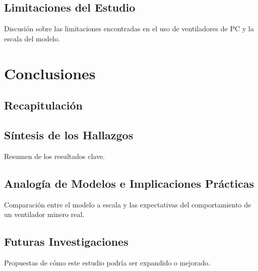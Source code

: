 \documentclass[journal,article,submit,pdftex,moreauthors]{Definitions/mdpi}
\begin{document}
\subsection{Limitaciones del Estudio}
Discusión sobre las limitaciones encontradas en el uso de ventiladores de PC y la escala del modelo.

\section{Conclusiones}
\subsection{Recapitulación}
\subsection{Síntesis de los Hallazgos}
Resumen de los resultados clave.

\subsection{Analogía de Modelos e Implicaciones Prácticas}
Comparación entre el modelo a escala y las expectativas del comportamiento de un ventilador minero real.

\subsection{Futuras Investigaciones}
Propuestas de cómo este estudio podría ser expandido o mejorado.

\vspace{6pt}


\end{document}
